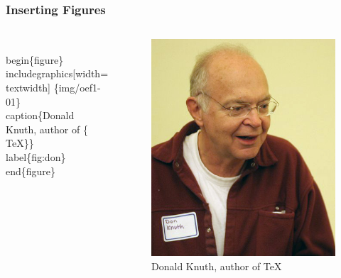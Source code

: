 \documentclass{beamer}
\begin{document}
\begin{frame}[fragile]
  \frametitle{Inserting Figures}

  \begin{columns}[c]
\begin{semiverbatim}
\alert<1>{\\begin\{figure\}}
  \alert<2>{\\includegraphics[width=\\textwidth]
    \{img/oef1-01\}}
  \alert<3>{\\caption\{Donald Knuth, author of
    \{\\TeX\}\}}
  \alert<4>{\\label\{fig:don\}}
\alert<1>{\\end\{figure\}}
\end{semiverbatim}

    \begin{figure}
      \includegraphics[width=\textwidth]{img/oef1-01}
      \caption{Donald Knuth, author of {\TeX}}
      \label{fig:don}
    \end{figure}

  \end{columns}

\end{frame}
\end{document}
